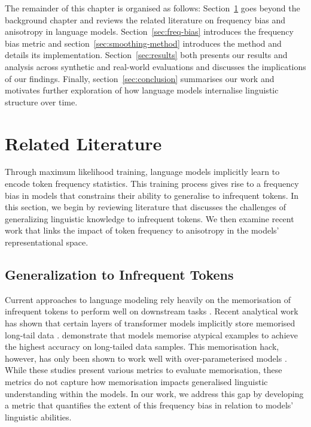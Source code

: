The remainder of this chapter is organised as follows: Section~\ref{sec:related-literature} goes beyond the background chapter and reviews the related literature on frequency bias and anisotropy in language models. Section~\ref{sec:freq-bias} introduces the frequency bias metric and section~\ref{sec:smoothing-method} introduces the \smoothing method and details its implementation. Section~\ref{sec:results} both presents our results and analysis across synthetic and real-world evaluations and discusses the implications of our findings. Finally, section~\ref{sec:conclusion} summarises our work and motivates further exploration of how language models internalise linguistic structure over time.

\section{Related Literature}
\label{sec:related-literature}

Through maximum likelihood training, language models implicitly learn to encode token frequency statistics. This training process gives rise to a frequency bias in models that constrains their ability to generalise to infrequent tokens. In this section, we begin by reviewing literature that discusses the challenges of generalizing linguistic knowledge to infrequent tokens. We then examine recent work that links the impact of token frequency to anisotropy in the models' representational space.

\subsection{Generalization to Infrequent Tokens}

Current approaches to language modeling rely heavily on the memorisation of infrequent tokens to perform well on downstream tasks \citep{feldman2020does}. Recent analytical work has shown that certain layers of transformer models implicitly store memorised long-tail data \citep{haviv2023understanding, kobayashi2023transformer}. \citet{feldman2020neural} demonstrate that models memorise atypical examples to achieve the highest accuracy on long-tailed data samples. This memorisation hack, however, has only been shown to work well with over-parameterised models \citep{belkin2019reconciling}. While these studies present various metrics to evaluate memorisation, these metrics do not capture how memorisation impacts generalised linguistic understanding within the models. In our work, we address this gap by developing a metric that quantifies the extent of this frequency bias in relation to models' linguistic abilities.

